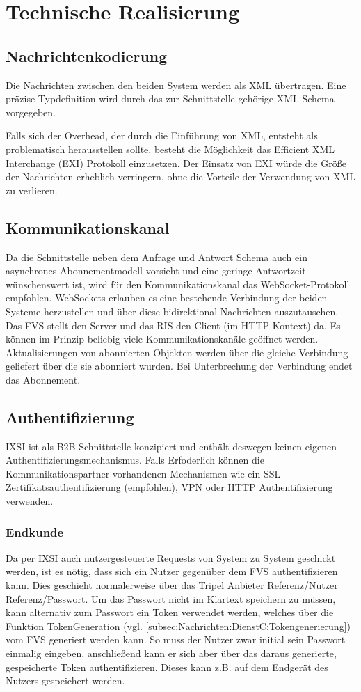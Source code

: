 \chapter{Technische Realisierung}
\label{sec:TechnischeRealisierung}


\section{Nachrichtenkodierung}
Die Nachrichten zwischen den beiden System werden als XML übertragen. Eine präzise Typdefinition wird durch das zur Schnittstelle gehörige XML Schema vorgegeben.

Falls sich der Overhead, der durch die Einführung von XML, entsteht als problematisch herausstellen sollte, besteht die Möglichkeit das Efficient XML Interchange (EXI) Protokoll einzusetzen. Der Einsatz von EXI würde die Größe der Nachrichten erheblich verringern, ohne die Vorteile der Verwendung von XML zu verlieren.

\section{Kommunikationskanal}
Da die Schnittstelle neben dem Anfrage und Antwort Schema auch ein asynchrones Abonnementmodell vorsieht und eine geringe Antwortzeit wünschenswert ist, wird für den Kommunikationskanal das WebSocket-Protokoll empfohlen. WebSockets erlauben es eine bestehende Verbindung der beiden Systeme herzustellen und über diese bidirektional Nachrichten auszutauschen. Das FVS stellt den Server und das RIS den Client (im HTTP Kontext) da. Es können im Prinzip beliebig viele Kommunikationskanäle geöffnet werden. Aktualisierungen von abonnierten Objekten werden über die gleiche Verbindung geliefert über die sie abonniert wurden. Bei Unterbrechung der Verbindung endet das Abonnement.

\section{Authentifizierung}
IXSI ist als B2B-Schnittstelle konzipiert und enthält deswegen keinen eigenen Authentifizierungsmechanismus. Falls Erfoderlich können die Kommunikationspartner vorhandenen Mechanismen wie ein SSL-Zertifikatsauthentifizierung (empfohlen), VPN oder HTTP Authentifizierung verwenden.

\subsection{Endkunde}
Da per IXSI auch nutzergesteuerte Requests von System zu System geschickt werden, ist
es nötig, dass sich ein Nutzer gegenüber dem FVS authentifizieren kann. 
Dies geschieht normalerweise über das Tripel Anbieter Referenz/Nutzer Referenz/Passwort. Um das  Passwort nicht im Klartext speichern zu müssen, kann alternativ zum Passwort ein Token 
verwendet werden, welches über die Funktion TokenGeneration (vgl. \cref{subsec:Nachrichten:DienstC:Tokengenerierung}) vom FVS 
generiert werden kann. So muss der Nutzer zwar initial sein Passwort einmalig eingeben, anschließend kann er sich aber über das daraus generierte, gespeicherte Token
authentifizieren. Dieses kann z.B. auf dem Endgerät des Nutzers gespeichert werden.

